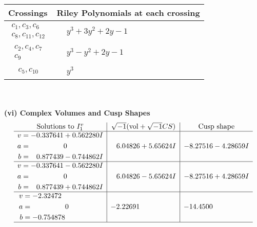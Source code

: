 \documentclass[1p]{elsarticle_modified}
\theoremstyle{definition}
\newcommand{\I}{\sqrt{-1}}
\begin{document}
\begin{tabular}{m{50pt}|m{274pt}}
Crossings & \hspace{64pt}Riley Polynomials at each crossing \\
\hline $$\begin{aligned}c_{1},c_{3},c_{6}\\c_{8},c_{11},c_{12}\end{aligned}$$&$\begin{aligned}
&y^3+3 y^2+2 y-1
\end{aligned}$\\
\hline $$\begin{aligned}c_{2},c_{4},c_{7}\\c_{9}\end{aligned}$$&$\begin{aligned}
&y^3- y^2+2 y-1
\end{aligned}$\\
\hline $$\begin{aligned}c_{5},c_{10}\end{aligned}$$&$\begin{aligned}
&y^3
\end{aligned}$\\
\hline
\end{tabular}\\~\\
\newpage\flushleft \textbf{(vi) Complex Volumes and Cusp Shapes}
$$\begin{array}{c|c|c}  
\text{Solutions to }I^v_{1}& \I (\text{vol} + \sqrt{-1}CS) & \text{Cusp shape}\\
 \hline 
\begin{aligned}
v &= -0.337641 + 0.562280 I \\
a &= \phantom{-0.000000 } 0 \\
b &= \phantom{-}0.877439 - 0.744862 I\end{aligned}
 & \phantom{-}6.04826 + 5.65624 I & -8.27516 - 4.28659 I \\ \hline\begin{aligned}
v &= -0.337641 - 0.562280 I \\
a &= \phantom{-0.000000 } 0 \\
b &= \phantom{-}0.877439 + 0.744862 I\end{aligned}
 & \phantom{-}6.04826 - 5.65624 I & -8.27516 + 4.28659 I \\ \hline\begin{aligned}
v &= -2.32472\phantom{ +0.000000I} \\
a &= \phantom{-0.000000 } 0 \\
b &= -0.754878\phantom{ +0.000000I}\end{aligned}
 & -2.22691\phantom{ +0.000000I} & -14.4500\phantom{ +0.000000I}\\
 \hline 
 \end{array}$$\newpage\newpage\renewcommand{\arraystretch}{1}
\end{document}
